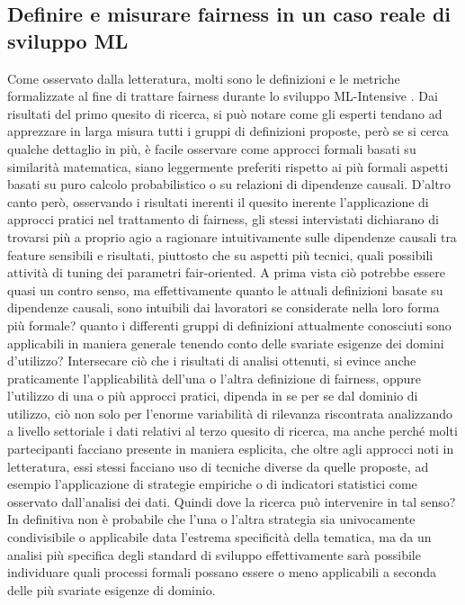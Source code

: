     \subsection{Definire e misurare fairness in un caso reale di sviluppo ML}
    Come osservato dalla letteratura, molti sono le definizioni e le metriche formalizzate al fine di trattare fairness durante lo sviluppo ML-Intensive \cite{FairnessDefinitionExplained}. Dai risultati del primo quesito di ricerca, si può notare come gli esperti tendano ad apprezzare in larga misura tutti i gruppi di definizioni proposte, però se si cerca qualche dettaglio in più, è facile osservare come approcci formali basati su similarità matematica, siano leggermente preferiti rispetto ai più formali aspetti basati su puro calcolo probabilistico o su relazioni di dipendenze causali. D'altro canto però, osservando i risultati inerenti il quesito inerente l'applicazione di approcci pratici nel trattamento di fairness, gli stessi intervistati dichiarano di trovarsi più a proprio agio a ragionare intuitivamente sulle dipendenze causali tra feature sensibili e risultati, piuttosto che su aspetti più tecnici, quali possibili attività di tuning dei parametri fair-oriented. A prima vista ciò potrebbe essere quasi un contro senso, ma effettivamente quanto le attuali definizioni basate su dipendenze causali, sono intuibili dai lavoratori se considerate nella loro forma più formale? quanto i differenti gruppi di definizioni attualmente conosciuti sono applicabili in maniera generale tenendo conto delle svariate esigenze dei domini d'utilizzo? Intersecare ciò che i risultati di analisi ottenuti, si evince anche praticamente l'applicabilità dell'una o l'altra definizione di fairness, oppure l'utilizzo di una o più approcci pratici, dipenda in se per se dal dominio di utilizzo, ciò non solo per l'enorme variabilità di rilevanza riscontrata analizzando a livello settoriale i dati relativi al terzo quesito di ricerca, ma anche perché molti partecipanti facciano presente in maniera esplicita, che oltre agli approcci noti in letteratura, essi stessi facciano uso di tecniche diverse da quelle proposte, ad esempio l'applicazione di strategie empiriche o di indicatori statistici come osservato dall'analisi dei dati. Quindi dove la ricerca può intervenire in tal senso? In definitiva non è probabile che l'una o l'altra strategia sia univocamente condivisibile o applicabile data l'estrema specificità della tematica, ma da un analisi più specifica degli standard di sviluppo effettivamente sarà possibile individuare quali processi formali possano essere o meno applicabili a seconda delle più svariate esigenze di dominio.
    

